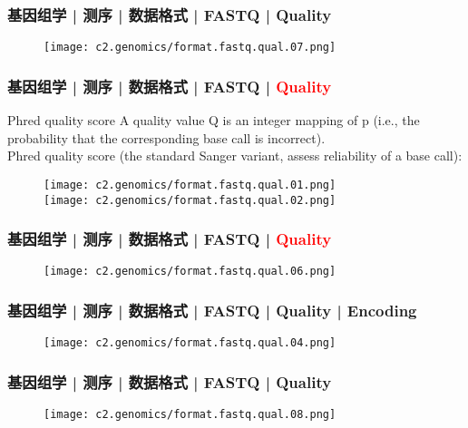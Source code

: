 \begin{frame}
  \frametitle{基因组学 | 测序 | 数据格式 | FASTQ | Quality}
  \begin{figure}
    \centering
    \texttt{[image: c2.genomics/format.fastq.qual.07.png]}
  \end{figure}
\end{frame}
    
\begin{frame}
  \frametitle{基因组学 | 测序 | 数据格式 | FASTQ | \textcolor{red}{Quality}}
  \begin{block}{Phred quality score}
A quality value Q is an integer mapping of p (i.e., the probability that the corresponding base call is incorrect).\\
\vspace{1em}
Phred quality score (the standard Sanger variant, assess reliability of a base call): 
  \end{block}
  \begin{figure}
    \centering
    \texttt{[image: c2.genomics/format.fastq.qual.01.png]}\\
    \vspace{1em}
    \texttt{[image: c2.genomics/format.fastq.qual.02.png]}
  \end{figure}
\end{frame}

\begin{frame}
  \frametitle{基因组学 | 测序 | 数据格式 | FASTQ | \textcolor{red}{Quality}}
  \begin{figure}
    \centering
    \texttt{[image: c2.genomics/format.fastq.qual.06.png]}
  \end{figure}
\end{frame}
    
\begin{frame}
  \frametitle{基因组学 | 测序 | 数据格式 | FASTQ | Quality | Encoding}
  \begin{figure}
    \centering
    \texttt{[image: c2.genomics/format.fastq.qual.04.png]}
  \end{figure}
\end{frame}

\begin{frame}
  \frametitle{基因组学 | 测序 | 数据格式 | FASTQ | Quality}
  \begin{figure}
    \centering
    \texttt{[image: c2.genomics/format.fastq.qual.08.png]}
  \end{figure}
\end{frame}
    
